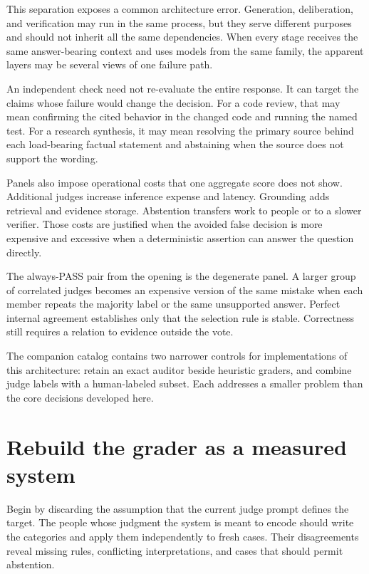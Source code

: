 This separation exposes a common architecture error. Generation, deliberation, and verification may run in the same process, but they serve different purposes and should not inherit all the same dependencies. When every stage receives the same answer-bearing context and uses models from the same family, the apparent layers may be several views of one failure path.

An independent check need not re-evaluate the entire response. It can target the claims whose failure would change the decision. For a code review, that may mean confirming the cited behavior in the changed code and running the named test. For a research synthesis, it may mean resolving the primary source behind each load-bearing factual statement and abstaining when the source does not support the wording.

Panels also impose operational costs that one aggregate score does not show. Additional judges increase inference expense and latency. Grounding adds retrieval and evidence storage. Abstention transfers work to people or to a slower verifier. Those costs are justified when the avoided false decision is more expensive and excessive when a deterministic assertion can answer the question directly.

The always-PASS pair from the opening is the degenerate panel. A larger group of correlated judges becomes an expensive version of the same mistake when each member repeats the majority label or the same unsupported answer. Perfect internal agreement establishes only that the selection rule is stable. Correctness still requires a relation to evidence outside the vote.

The companion catalog contains two narrower controls for implementations of this architecture: retain an exact auditor beside heuristic graders, and combine judge labels with a human-labeled subset. Each addresses a smaller problem than the core decisions developed here.

\section{Rebuild the grader as a measured system}\label{rebuild-the-grader-as-a-measured-system}

Begin by discarding the assumption that the current judge prompt defines the target. The people whose judgment the system is meant to encode should write the categories and apply them independently to fresh cases. Their disagreements reveal missing rules, conflicting interpretations, and cases that should permit abstention.


